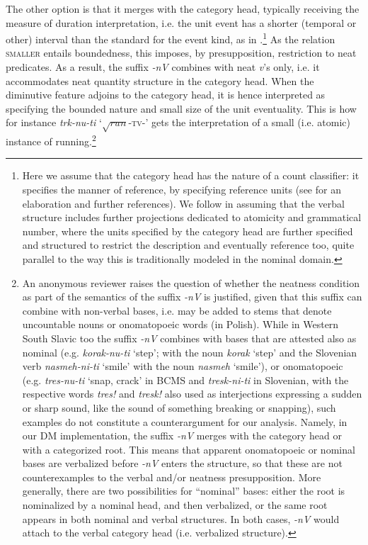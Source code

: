 \documentclass[output=paper,colorlinks,citecolor=brown]{langscibook}
\begin{document}
The other option is that it merges with the category head, typically receiving the measure of duration interpretation, i.e. the unit event has a shorter (temporal or other) interval than the standard for the event kind, as in .\footnote{Here we assume that the category head has the nature of a count classifier: it specifies the manner of reference, by specifying reference units (see \citealt{sta+:Arsenijevic2022} for an elaboration and further references). We follow \citet{Milosavljevic2023PhD} in assuming that the verbal structure includes further projections dedicated to atomicity and grammatical number, where the units specified by the category head are further specified and structured to restrict the description and eventually reference too, quite parallel to the way this is traditionally modeled in the nominal domain.} As the relation \textsc{smaller} entails boundedness, this imposes, by presupposition, restriction to neat predicates. As a result, the suffix \textit{-nV} combines with neat \textit{v}’s only, i.e. it accommodates neat quantity structure in the category head. When the diminutive feature adjoins to the category head, it is hence interpreted as specifying the bounded nature and small size of the unit eventuality. This is how for instance \textit{trk-nu-ti} `${\sqrt{run}}$-\textsc{tv}-{\INF}' gets the interpretation of a small (i.e. atomic) instance of running.\footnote{An anonymous reviewer raises the question of whether the neatness condition as part of the semantics of the suffix \textit{-nV} is justified, given that this suffix can combine with non-verbal bases, i.e. may be added to stems that denote uncountable nouns or onomatopoeic words (in Polish). While in Western South Slavic too the suffix \textit{-nV} combines with bases that are attested also as nominal (e.g. \textit{korak-nu-ti} `step'; with the noun \textit{korak} `step' and the Slovenian verb \textit{nasmeh-ni-ti} `smile' with the noun \textit{nasmeh} `smile'), or onomatopoeic (e.g. \textit{tres-nu-ti} `snap, crack' in BCMS and \textit{tresk-ni-ti} in Slovenian, with the respective words \textit{tres!} and \textit{tresk!} also used as interjections expressing a sudden or sharp sound, like the sound of something breaking or snapping), such examples do not constitute a counterargument for our analysis. Namely, in our DM implementation, the suffix \textit{-nV} merges with the category head or with a categorized root. This means that apparent onomatopoeic or nominal bases are verbalized before \textit{-nV} enters the structure, so that these are not counterexamples to the verbal and/or neatness presupposition. More generally, there are two possibilities for ``nominal'' bases: either the root is nominalized by a nominal head, and then verbalized, or the same root appears in both nominal and verbal structures. In both cases, \textit{-nV} would attach to the verbal category head (i.e. verbalized structure). 
}
\end{document}
